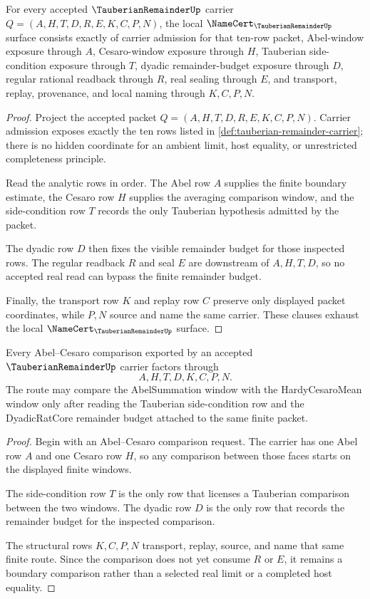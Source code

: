 \begin{theorem}
\label{thm:tauberian-remainder-namecert-obligations}
For every accepted $\TauberianRemainderUp$ carrier $Q=(A,H,T,D,R,E,K,C,P,N)$, the local $\NameCert_{\TauberianRemainderUp}$ surface consists exactly of carrier admission for that ten-row packet, Abel-window exposure through $A$, Cesaro-window exposure through $H$, Tauberian side-condition exposure through $T$, dyadic remainder-budget exposure through $D$, regular rational readback through $R$, real sealing through $E$, and transport, replay, provenance, and local naming through $K,C,P,N$.
\end{theorem}
\begin{proof}
Project the accepted packet $Q=(A,H,T,D,R,E,K,C,P,N)$. Carrier admission exposes exactly the ten rows listed in \autoref{def:tauberian-remainder-carrier}; there is no hidden coordinate for an ambient limit, host equality, or unrestricted completeness principle.

Read the analytic rows in order. The Abel row $A$ supplies the finite boundary estimate, the Cesaro row $H$ supplies the averaging comparison window, and the side-condition row $T$ records the only Tauberian hypothesis admitted by the packet.

The dyadic row $D$ then fixes the visible remainder budget for those inspected rows. The regular readback $R$ and seal $E$ are downstream of $A,H,T,D$, so no accepted real read can bypass the finite remainder budget.

Finally, the transport row $K$ and replay row $C$ preserve only displayed packet coordinates, while $P,N$ source and name the same carrier. These clauses exhaust the local $\NameCert_{\TauberianRemainderUp}$ surface.
\end{proof}

\begin{theorem}
\label{thm:tauberian-remainder-abel-cesaro-route}
Every Abel--Cesaro comparison exported by an accepted $\TauberianRemainderUp$ carrier factors through
$$
A,H,T,D,K,C,P,N.
$$
The route may compare the AbelSummation window with the HardyCesaroMean window only after reading the Tauberian side-condition row and the DyadicRatCore remainder budget attached to the same finite packet.
\end{theorem}
\begin{proof}
Begin with an Abel--Cesaro comparison request. The carrier has one Abel row $A$ and one Cesaro row $H$, so any comparison between those faces starts on the displayed finite windows.

The side-condition row $T$ is the only row that licenses a Tauberian comparison between the two windows. The dyadic row $D$ is the only row that records the remainder budget for the inspected comparison.

The structural rows $K,C,P,N$ transport, replay, source, and name that same finite route. Since the comparison does not yet consume $R$ or $E$, it remains a boundary comparison rather than a selected real limit or a completed host equality.
\end{proof}

